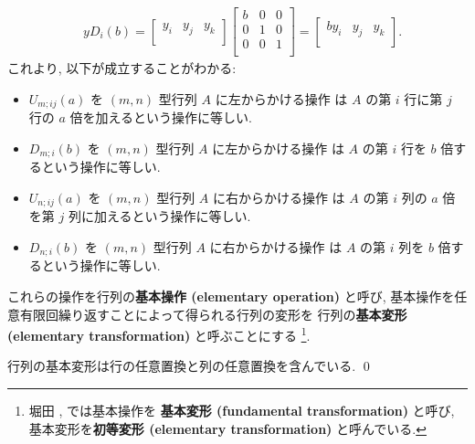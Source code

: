 \documentclass[12pt,twoside]{jarticle}
\begin{document}
\begin{align*}
  \\ &
  y D_i(b) =
  \begin{bmatrix}
    y_i & y_j & y_k \\
  \end{bmatrix}
  \begin{bmatrix}
    b & 0 & 0 \\
    0 & 1 & 0 \\
    0 & 0 & 1 \\
  \end{bmatrix}
  =
  \begin{bmatrix}
    by_i & y_j & y_k \\
  \end{bmatrix}.
\end{align*}
これより, 以下が成立することがわかる:
\begin{itemize}
\item $U_{m;ij}(a)$ を $(m,n)$ 型行列 $A$ に左からかける操作
  は $A$ の第 $i$ 行に第 $j$ 行の $a$ 倍を加えるという操作に等しい.
\item $D_{m;i}(b)$ を $(m,n)$ 型行列 $A$ に左からかける操作
  は $A$ の第 $i$ 行を $b$ 倍するという操作に等しい.
\item $U_{n;ij}(a)$ を $(m,n)$ 型行列 $A$ に右からかける操作
  は $A$ の第 $i$ 列の $a$ 倍を第 $j$ 列に加えるという操作に等しい.
\item $D_{n;i}(b)$ を $(m,n)$ 型行列 $A$ に右からかける操作
  は $A$ の第 $i$ 列を $b$ 倍するという操作に等しい.
\end{itemize}
これらの操作を行列の{\bf 基本操作 (elementary operation)} と呼び,
基本操作を任意有限回繰り返すことによって得られる行列の変形を
行列の{\bf 基本変形 (elementary transformation)} と呼ぶことにする%
\footnote{堀田 \cite{gun-kagun}, \cite{10wa} では基本操作を
  {\bf 基本変形 (fundamental transformation)} と呼び,
  基本変形を{\bf 初等変形 (elementary transformation)} と呼んでいる.}.


\begin{question}
\label{q:elem-op-permutation}
  行列の基本変形は行の任意置換と列の任意置換を含んでいる.
  \qed
\end{question}
\end{document}
